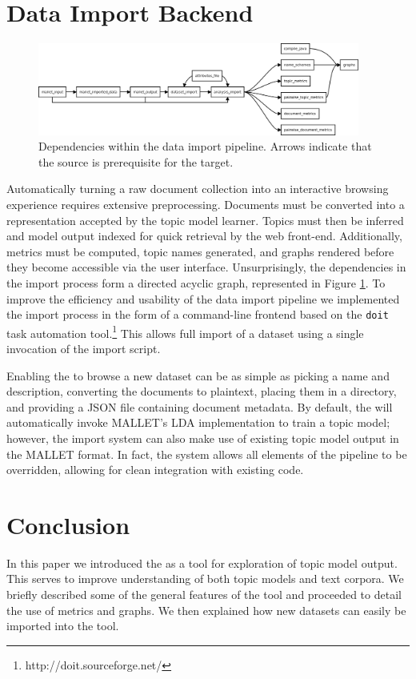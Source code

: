 \documentclass[11pt]{article}
\begin{document}
\section{Data Import Backend}
\begin{figure}[t]
 \centering
 \includegraphics[width=400px,keepaspectratio=true]{./build_flowchart.png}
 \caption{Dependencies within the data import pipeline. Arrows indicate that the source is prerequisite for the target.}
 \label{fig:build_flowchart}
\end{figure}

Automatically turning a raw document collection into an interactive browsing
experience requires extensive preprocessing. Documents must be converted into a
representation accepted by the topic model learner. Topics must then be inferred
and model output indexed for quick retrieval by the web front-end.
Additionally, metrics must be computed, topic names generated, and graphs rendered
before they become accessible via the user interface. Unsurprisingly, the dependencies
in the import process form a directed acyclic graph, represented in Figure \ref{fig:build_flowchart}. To
improve the efficiency and usability of the data import pipeline we implemented
the import process in the form of a command-line frontend based on the \texttt{doit}
task automation tool.\footnote{http://doit.sourceforge.net/} This allows full
import of a dataset using a single invocation of the import script.

Enabling the \tool{} to browse a new dataset can be as simple as picking a name
and description, converting the documents to plaintext, placing them in a
directory, and providing a JSON file containing document metadata. By default,
the \tool{} will automatically invoke MALLET's LDA implementation to train a
topic model\cite{McCallum2002}; however, the import system can also make use of
existing topic model output in the MALLET format. In fact, the system allows all
elements of the pipeline to be overridden, allowing for clean integration with
existing code.

\section{Conclusion}
In this paper we introduced the \tool{} as a tool for exploration of
topic model output. This serves to improve understanding of both topic models
and text corpora. We briefly described some of the general features of the tool
and proceeded to detail the use of metrics and graphs. We then explained how
new datasets can easily be imported into the tool.



\end{document}
